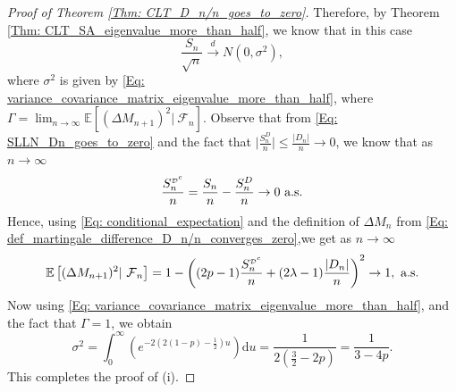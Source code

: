 \documentclass{article}
\numberwithin{equation}{section}
\newcommand{\FF}{\mbox{${\mathcal F}$}}
\newcommand{\DD}{\mbox{${\mathcal D}$}}
\newcommand{\1}{\mathbf{1}}
\newcommand{\0}{\mathbf{0}}
\newcommand{\E}{\mbox{${\mathbb E}$}}
\begin{document}
\begin{proof}[Proof of Theorem \ref{Thm: CLT_D_n/n_goes_to_zero}]
Therefore, by Theorem \ref{Thm: CLT_SA_eigenvalue_more_than_half}, we know that in this case 
\begin{equation*}
\frac{S_n}{\sqrt{n}} \stackrel{d}{\longrightarrow }N (0, \sigma^2),
\end{equation*}
where $\sigma^2$ is given by \eqref{Eq: variance_covariance_matrix_eigenvalue_more_than_half}, where $\Gamma = \lim_{n \to \infty}\E \left[ (\Delta M_{n+1})^2 | \ \FF_{n}\right].$
Observe that from \eqref{Eq: SLLN_Dn_goes_to_zero} and the fact that $\lvert \frac{S_n^D}{n}\rvert \leq \frac{\lvert D_n \rvert }{n}\rightarrow 0$, we know that as $n \to \infty$
\[
\frac{S_n^{{\tiny \DD}^c}}{n}= \frac{S_n}{n}- \frac{S_n^D}{n} \rightarrow 0 \text{ a.s.}
\]
Hence, using \eqref{Eq: conditional_expectation} and the definition of $\Delta M_n$ from \eqref{Eq: def_martingale_difference_D_n/n_converges_zero},we get as $n \to \infty$
\begin{equation}
\label{Eq: conditional_expectation_martingale_difference_limit}
\E \left[ (\Delta M_{n+1})^2 | \ \FF_{n}\right]= 1-\left((2p-1) \frac{S_n^{{\tiny \DD}^c}}{n} + (2\lambda-1) \frac{|D_n|}{n}\right)^2 \rightarrow 1, \text{ a.s.} 
\end{equation} 
Now using \eqref{Eq: variance_covariance_matrix_eigenvalue_more_than_half}, and the fact that $\Gamma=1$, we obtain
\[
\sigma^2= \int_{0}^{\infty}{\left(e^{-2(2(1-p)-\frac{1}{2})u}\right)\mathrm{d}u}= \frac{1}{2(\frac{3}{2}-2p)}=\frac{1}{3-4p}.
\]
This completes the proof of (i).


\end{proof}
\end{document}
